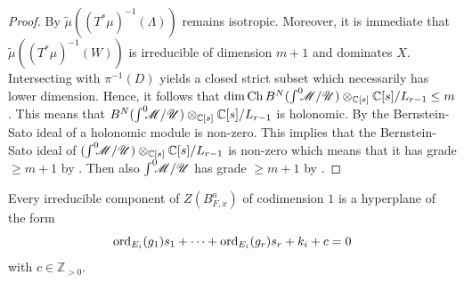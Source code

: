 \begin{proof}
  By  $\widetilde{\mu}((T^*\mu)^{-1}(\Lambda))$ remains isotropic.
  Moreover, it is immediate that $\widetilde{\mu}((T^*\mu)^{-1}(W))$ is irreducible of dimension $m+1$ and dominates $X$.
  Intersecting with $\pi^{-1}(D)$ yields a closed strict subset which necessarily has lower dimension.
  Hence, it follows that $\dim \operatorname{Ch} B^N (\int^0 \mkern -8mu\mathscr{M}/\allowbreak \mathscr{U})\otimes_{\mathbb{C}[s]}\mathbb{C}[s]/L_{r-1} \leq m$.
  This means that $B^N(\int^0 \mkern -8mu\mathscr{M}/ \mathscr{U})\otimes_{\mathbb{C}[s]}\mathbb{C}[s]/L_{r-1}$ is holonomic.
  By  the Bernstein-Sato ideal of a holonomic module is non-zero.
  This implies that the Bernstein-Sato ideal of $(\int^0 \mkern -8mu\mathscr{M}/ \mathscr{U})\otimes_{\mathbb{C}[s]}\mathbb{C}[s]/L_{r-1}$ is non-zero which means that it has grade $\geq m+1$ by .
  Then also $\int^0 \mkern -8mu\mathscr{M}/\mathscr{U}$ has grade $\geq m+1$ by .
  \end{proof}
  \begin{theorem}\label{thm: EstimateBernsteinSatoZeroLocust}
  Every irreducible component of $Z(B_{F,x}^a)$ of codimension $1$ is a hyperplane of the form
  $$\operatorname{ord}_{E_i}(g_1) s_1 + \cdots + \operatorname{ord}_{E_i}(g_r)s_r + k_i + c=0$$
  with $c \in \mathbb{Z}_{> 0 }$.
\end{theorem}
